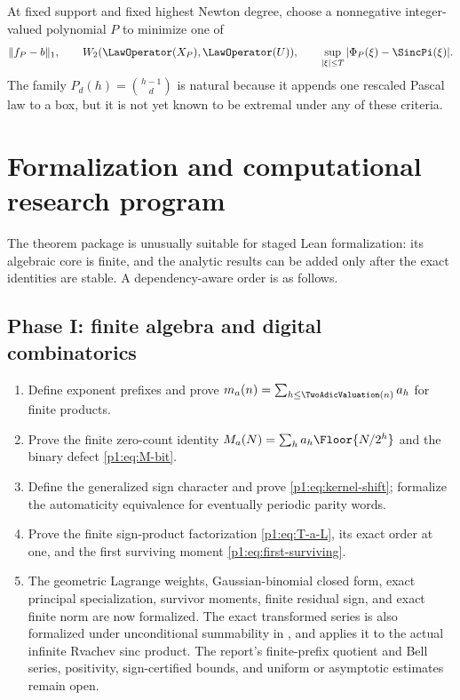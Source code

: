 \documentclass[11pt,oneside]{article}
\numberwithin{equation}{section}
\theoremstyle{definition}
\theoremstyle{remark}
\begin{document}
\begin{problem}
At fixed support and fixed highest Newton degree, choose a nonnegative integer-valued
polynomial $P$ to minimize one of
\[
 \|f_P-b\|_1,
 \qquad
 W_2(\LawOperator(X_P),\LawOperator(U)),
 \qquad
 \sup_{|\xi|\le T}|\Phi_P(\xi)-\SincPi(\xi)|.
\]
The family $P_d(h)=\binom{h-1}{d}$ is natural because it appends one rescaled Pascal law to a
box, but it is not yet known to be extremal under any of these criteria.
\end{problem}


\section{Formalization and computational research program}
\label{p1:sec:formalization}

The theorem package is unusually suitable for staged Lean formalization: its algebraic core
is finite, and the analytic results can be added only after the exact identities are stable.
A dependency-aware order is as follows.

\subsection{Phase I: finite algebra and digital combinatorics}

\begin{enumerate}
\item Define exponent prefixes and prove
      $m_a(n)=\sum_{h\le\TwoAdicValuation(n)}a_h$ for finite products.
\item Prove the finite zero-count identity
      $M_a(N)=\sum_ha_h\Floor{N/2^h}$ and the binary defect
      \eqref{p1:eq:M-bit}.
\item Define the generalized sign character and prove
      \eqref{p1:eq:kernel-shift}; formalize the automaticity equivalence for eventually
      periodic parity words.
\item Prove the finite sign-product factorization \eqref{p1:eq:T-a-L}, its exact order at one,
      and the first surviving moment \eqref{p1:eq:first-surviving}.
\item The geometric Lagrange weights, Gaussian-binomial closed form, exact
      principal specialization, survivor moments, finite residual sign, and exact finite
      norm are now formalized.  The exact transformed series is also formalized under
      unconditional summability in , and
       applies it to the actual infinite Rvachev
      sinc product.  The report's finite-prefix quotient and Bell series, positivity,
      sign-certified bounds, and uniform or asymptotic estimates remain open.
\end{enumerate}
\end{document}
